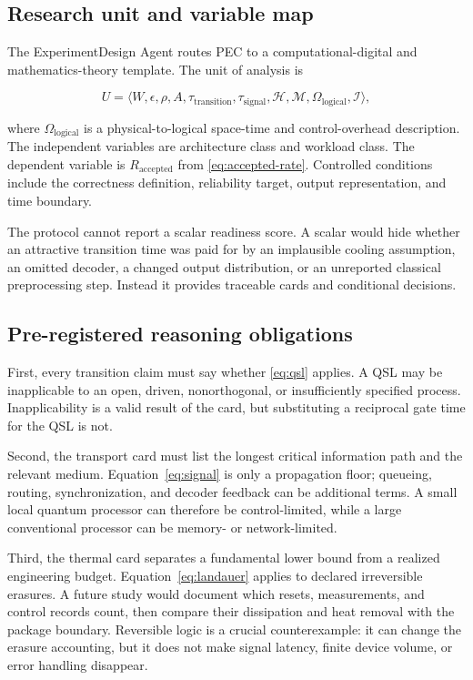 \documentclass[conference]{IEEEtran}
\begin{document}
\subsection{Research unit and variable map}

The ExperimentDesign Agent routes PEC to a computational-digital and
mathematics-theory template. The unit of analysis is

\begin{equation}
U=\langle W,\epsilon,\rho,A,
\tau_{\mathrm{transition}},\tau_{\mathrm{signal}},
\mathcal{H},\mathcal{M},\Omega_{\mathrm{logical}},\mathcal{I}\rangle,
\label{eq:unit}
\end{equation}

where \(\Omega_{\mathrm{logical}}\) is a physical-to-logical space-time and
control-overhead description. The independent variables are architecture class
and workload class. The dependent variable is
\(R_{\mathrm{accepted}}\) from \eqref{eq:accepted-rate}. Controlled
conditions include the correctness definition, reliability target, output
representation, and time boundary.

The protocol cannot report a scalar readiness score. A scalar would hide
whether an attractive transition time was paid for by an implausible cooling
assumption, an omitted decoder, a changed output distribution, or an
unreported classical preprocessing step. Instead it provides traceable cards
and conditional decisions.

\subsection{Pre-registered reasoning obligations}

First, every transition claim must say whether \eqref{eq:qsl} applies. A QSL
may be inapplicable to an open, driven, nonorthogonal, or insufficiently
specified process. Inapplicability is a valid result of the card, but
substituting a reciprocal gate time for the QSL is not.

Second, the transport card must list the longest critical information path and
the relevant medium. Equation~\eqref{eq:signal} is only a propagation floor;
queueing, routing, synchronization, and decoder feedback can be additional
terms. A small local quantum processor can therefore be control-limited,
while a large conventional processor can be memory- or network-limited.

Third, the thermal card separates a fundamental lower bound from a realized
engineering budget. Equation~\eqref{eq:landauer} applies to declared
irreversible erasures. A future study would document which resets,
measurements, and control records count, then compare their dissipation and
heat removal with the package boundary. Reversible logic is a crucial
counterexample: it can change the erasure accounting, but it does not make
signal latency, finite device volume, or error handling disappear.
\end{document}

